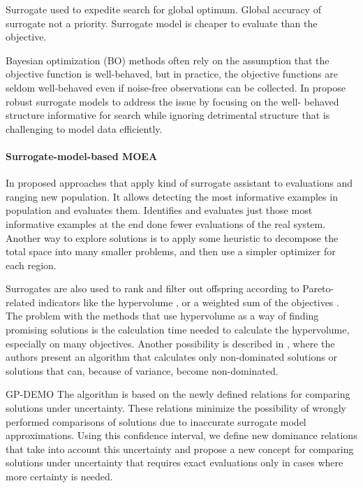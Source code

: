         Surrogate used to expedite search for global optimum. Global accuracy of surrogate
        not a priority. Surrogate model is cheaper to evaluate than the objective.

        Bayesian optimization (BO) methods often rely on the assumption that the objective function is well-behaved, but in practice, the objective functions are seldom well-behaved even if noise-free observations can be collected. In \cite{bodin2019modulating} propose robust surrogate models to address the issue by focusing on the well- behaved structure informative for search while ignoring detrimental structure that is challenging to model data efficiently.

        \paragraph{Surrogate-model-based MOEA}
        In \cite{KrallMD15} proposed approaches that apply kind of surrogate assistant to evaluations and ranging new population. It allows detecting the most informative examples in population and evaluates them. 
        Identifies and evaluates just those most informative examples at the end done fewer evaluations of the real system. Another way to explore solutions is to apply some heuristic to decompose the total space into many smaller problems, and then use a simpler optimizer for each region. 

        Surrogates are also used to rank and filter out offspring according to Pareto-related indicators like the hypervolume \cite{EmmerichGN06}, or a weighted sum of the objectives \cite{TaboadaBCW07}. The problem with the methods that use hypervolume as a way of finding promising solutions is the calculation time needed to calculate the hypervolume, especially on many objectives. Another possibility is described in \cite{Li2009}, where the authors present an algorithm that calculates only non-dominated solutions or solutions that can, because of variance, become non-dominated. 
        
        GP-DEMO \cite{MlakarPTF15} The algorithm is based on the newly defined relations for comparing solutions under uncertainty. These relations minimize the possibility of wrongly performed comparisons of solutions due to inaccurate 
        surrogate model approximations. Using this confidence interval, we define new dominance relations that take into account 
        this uncertainty and propose a new concept for comparing solutions under uncertainty that requires exact evaluations 
        only in cases where more certainty is needed.


